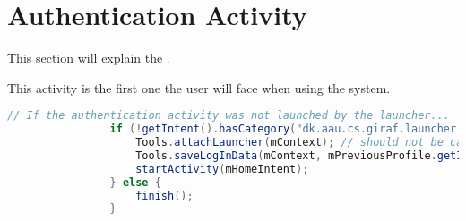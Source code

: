 \section{Authentication Activity}
This section will explain the .


This activity is the first one the user will face when using the \giraf[] system.

\begin{lstlisting}[style=sourceCode, language=JAVA, caption=This is code, label=lst:authenticationAcitivity] 
				// If the authentication activity was not launched by the launcher...
				if (!getIntent().hasCategory("dk.aau.cs.giraf.launcher.GIRAF")) {
					Tools.attachLauncher(mContext); // should not be called
					Tools.saveLogInData(mContext, mPreviousProfile.getId());
					startActivity(mHomeIntent);
				} else {
					finish();
				}
\end{lstlisting}